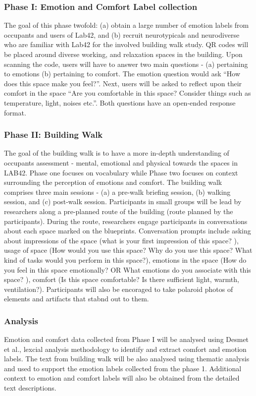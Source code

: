 \documentclass[acmconf, anonymous, review]{acmart}
\begin{document}
\subsubsection{Phase I: Emotion and Comfort Label collection}
The goal of this phase twofold: (a) obtain a large number of emotion labels from occupants and users of Lab42, and (b) recruit neurotypicals and neurodiverse who are familiar with Lab42 for the involved building walk study. QR codes will be placed around diverse working, and relaxation spaces in the building. Upon scanning the code, users will have to answer two main questions - (a) pertaining to emotions (b) pertaining to comfort. The emotion question would ask “How does this space make you feel?”. Next, users will be asked to reflect upon their comfort in the space “Are you comfortable in this space? Consider things such as temperature, light, noises etc.”. Both questions have an open-ended response format.

\subsubsection{Phase II: Building Walk}
The goal of the building walk is to have a more in-depth understanding of occupants assessment - mental, emotional and physical towards the spaces in LAB42. Phase one focuses on vocabulary while Phase two focuses on context surrounding the perception of emotions and comfort. The building walk comprises three main sessions - (a) a pre-walk briefing session, (b) walking session, and (c) post-walk session. Participants in small groups will be lead by researchers along a pre-planned route of the building (route planned by the participants). During the route, researchers engage participants in conversations about each space marked on the blueprints. Conversation  prompts include asking about impressions of the space (what is your first impression of this space? ), usage of space (How would you use this space? Why do you use this space? What kind of tasks would you perform in this space?), emotions in the space (How do you feel in this space emotionally? OR What emotions do you associate with this space? ), comfort (Is this space comfortable?	Is there sufficient light, warmth, ventilation?). Participants will also be encoraged to take polaroid photos of elements and artifacts that stabnd out to them. 

\subsubsection{Analysis}
Emotion and comfort data collected from Phase I will be analysed using Desmet et al., lexcial analysis methodology to identify and extract comfort and emotion labels. The text from building walk will be also analysed using thematic analysis and used to support the emotion labels collected from the phase 1. Additional context to emotion and comfort labels will also be obtained from the detailed text descriptions.
\end{document}
